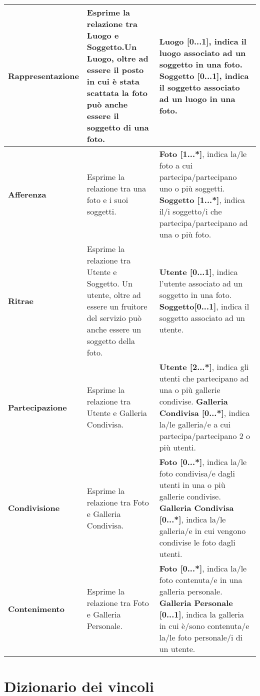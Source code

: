 \begin{xltabular}{\textwidth}{l X X}
        \textbf{Rappresentazione} & Esprime la relazione tra Luogo e Soggetto.Un Luogo, oltre ad essere il posto in cui è stata scattata la foto può anche essere il soggetto di una foto. & \textbf{Luogo [0...1]}, indica il luogo associato ad un soggetto in una foto. 
        \newline\textbf{Soggetto [0...1]}, indica il soggetto associato ad un luogo in una foto. \\
        \hline
        \textbf{Afferenza} & Esprime la relazione tra una foto e i suoi soggetti. & \textbf{Foto [1...*]}, indica la/le foto a cui partecipa/partecipano uno o più soggetti. 
        \newline\textbf{Soggetto [1...*]}, indica il/i soggetto/i che partecipa/partecipano ad una o più foto. \\
        \hline
        \textbf{Ritrae} & Esprime la relazione tra Utente e Soggetto. Un utente, oltre ad essere un fruitore del servizio può anche essere un soggetto della foto. & \textbf{Utente [0...1]}, indica l'utente associato ad un soggetto in una foto. 
        \newline\textbf{Soggetto[0...1]}, indica il soggetto associato ad un utente. \\
        \hline
        \textbf{Partecipazione} & Esprime la relazione tra Utente e Galleria Condivisa. & \textbf{Utente [2...*]}, indica gli utenti che partecipano ad una o più gallerie condivise. 
        \newline\textbf{Galleria Condivisa [0...*]}, indica la/le galleria/e a cui partecipa/partecipano 2 o più utenti.\\
        \hline
        \textbf{Condivisione} & Esprime la relazione tra Foto e Galleria Condivisa. & \textbf{Foto [0...*]}, indica la/le foto condivisa/e dagli utenti in una o più gallerie condivise. 
        \newline\textbf{Galleria Condivisa [0...*]}, indica la/le galleria/e in cui vengono condivise le foto dagli utenti. \\
        \hline
        \textbf{Contenimento} & Esprime la relazione tra Foto e Galleria Personale. & \textbf{Foto [0...*]}, indica la/le foto contenuta/e in una galleria personale. 
        \newline\textbf{Galleria Personale [0...1]}, indica la galleria in cui è/sono contenuta/e la/le foto personale/i di un utente.\\
        
 \end{xltabular}
\endgroup
\newpage
\section{Dizionario dei vincoli}

